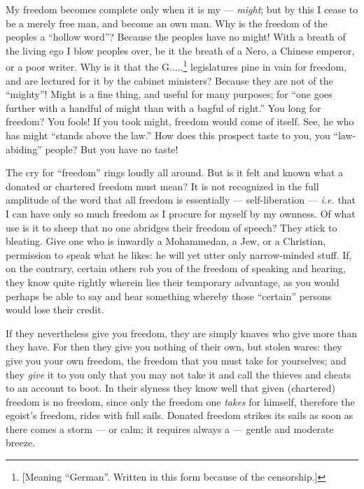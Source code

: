 My freedom becomes complete only when it is my --- \textit{might}; but by this 
I cease to be a merely free man, and become an own man. Why is the freedom of 
the peoples a ``hollow word''? Because the peoples have no might! With a 
breath of the living ego I blow peoples over, be it the breath of a Nero, a 
Chinese emperor, or a poor writer. Why is it that the G.....\footnote{[Meaning 
``German''. Written in this form because of the censorship.]} legislatures 
pine in vain for freedom, and are lectured for it by the cabinet ministers? 
Because they are not of the ``mighty''! Might is a fine thing, and useful 
for many purposes; for ``one goes further with a handful of might than with a 
bagful of right.'' You long for freedom? You fools! If you took might, 
freedom would come of itself. See, he who has might ``stands above the 
law.'' How does this prospect taste to you, you ``law-abiding'' people? But 
you have no taste!

The cry for ``freedom'' rings loudly all around. But is it felt and known 
what a donated or chartered freedom must mean? It is not recognized in the 
full amplitude of the word that all freedom is essentially --- self-liberation --- \textit{i.e.} that I can have only so much freedom as I procure for myself 
by my ownness. Of what use is it to sheep that no one abridges their freedom 
of speech? They stick to bleating. Give one who is inwardly a Mohammedan, a 
Jew, or a Christian, permission to speak what he likes: he will yet utter only 
narrow-minded stuff. If, on the contrary, certain others rob you of the 
freedom of speaking and hearing, they know quite rightly wherein lies their 
temporary advantage, as you would perhaps be able to say and hear something 
whereby those ``certain'' persons would lose their credit.

If they nevertheless give you freedom, they are simply knaves who give more 
than they have. For then they give you nothing of their own, but stolen wares: 
they give you your own freedom, the freedom that you must take for yourselves; 
and they \textit{give} it to you only that you may not take it and call the 
thieves and cheats to an account to boot. In their slyness they know well that 
given (chartered) freedom is no freedom, since only the freedom one 
\textit{takes} for himself, therefore the egoist's freedom, rides with full 
sails. Donated freedom strikes its sails as soon as there comes a storm --- or 
calm; it requires always a --- gentle and moderate breeze.

